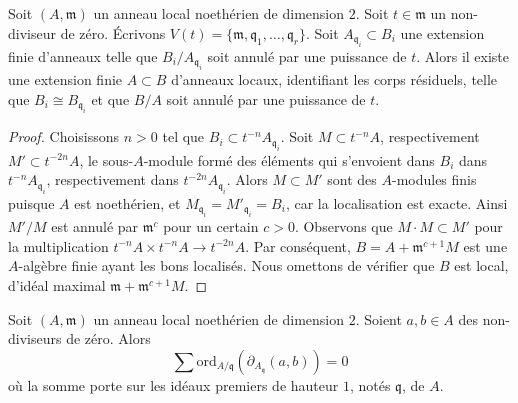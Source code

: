 \begin{lemma}
\label{lemma-perpare-key}
Soit $(A, \mathfrak m)$ un anneau local noethérien de dimension $2$.
Soit $t \in \mathfrak m$ un non-diviseur de zéro. Écrivons
$V(t) = \{\mathfrak m, \mathfrak q_1, \ldots, \mathfrak q_r\}$.
Soit $A_{\mathfrak q_i} \subset B_i$ une extension finie d'anneaux
telle que $B_i/A_{\mathfrak q_i}$ soit annulé par une puissance de
$t$. Alors il existe une extension finie $A \subset B$
d'anneaux locaux, identifiant les corps résiduels,
telle que $B_i \cong B_{\mathfrak q_i}$ et que $B/A$ soit annulé
par une puissance de $t$.
\end{lemma}

\begin{proof}
Choisissons $n > 0$ tel que $B_i \subset t^{-n}A_{\mathfrak q_i}$.
Soit $M \subset t^{-n}A$, respectivement $M' \subset t^{-2n}A$, le
sous-$A$-module formé des éléments qui s'envoient dans $B_i$ dans
$t^{-n}A_{\mathfrak q_i}$, respectivement dans $t^{-2n}A_{\mathfrak q_i}$.
Alors $M \subset M'$ sont des $A$-modules finis puisque $A$ est noethérien,
et $M_{\mathfrak q_i} = M'_{\mathfrak q_i} = B_i$, car la localisation
est exacte. Ainsi $M'/M$ est annulé par $\mathfrak m^c$ pour un certain
$c > 0$. Observons que $M \cdot M \subset M'$ pour la multiplication
$t^{-n}A \times t^{-n}A \to t^{-2n}A$. Par conséquent,
$B = A + \mathfrak m^{c + 1}M$ est une $A$-algèbre finie ayant les bons
localisés. Nous omettons de vérifier que $B$ est local, d'idéal maximal
$\mathfrak m + \mathfrak m^{c + 1}M$.
\end{proof}

\begin{lemma}
\label{lemma-key-nonzerodivisors}
Soit $(A, \mathfrak m)$ un anneau local noethérien de dimension $2$.
Soient $a, b \in A$ des non-diviseurs de zéro.
Alors
$$
\sum
\text{ord}_{A/\mathfrak q}(\partial_{A_{\mathfrak q}}(a, b))
=
0
$$
où la somme porte sur les idéaux premiers de hauteur $1$, notés $\mathfrak q$, de $A$.
\end{lemma}

